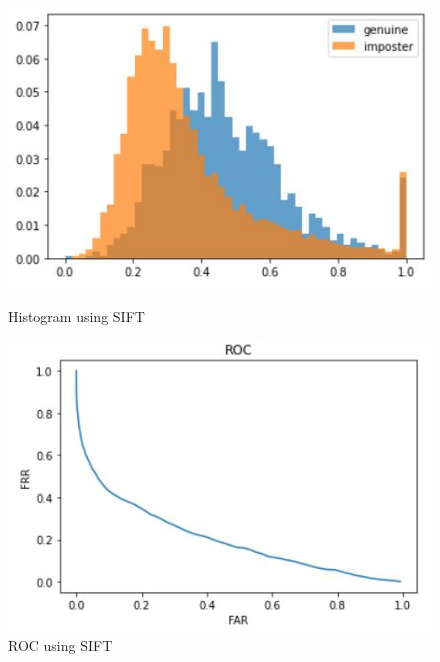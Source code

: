 \documentclass{article}
\begin{document}
\begin{figure}[!htb]
   \begin{minipage}{0.48\textwidth}
     \centering
     \includegraphics[width=.7\linewidth,scale=1]{./imgs/sift_his2.jpg}
     \caption{Histogram using SIFT}\label{Fig:Data3}
   \end{minipage}\hfill
   \begin{minipage}{0.48\textwidth}
     \centering
     \includegraphics[width=.7\linewidth, scale=1]{./imgs/sift_roc.jpg}
     \caption{ROC using SIFT}\label{Fig:Data4}
   \end{minipage}
\end{figure}
 
\end{document}
